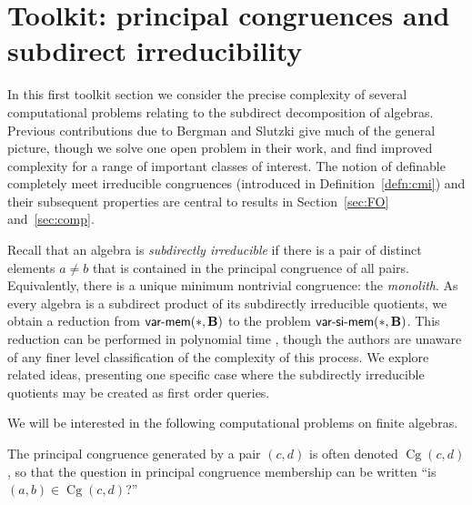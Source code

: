 \documentclass[10pt,a4paper]{amsart}
\theoremstyle{plain}
\theoremstyle{definition}
\newcommand{\varmem}{\textsf{var-mem}}
\newcommand{\varsimem}{\textsf{var-si-mem}}
\newcommand{\Cg}{\operatorname{Cg}}
\begin{document}
\section{Toolkit: principal congruences and subdirect irreducibility}\label{sec:si}
In this first toolkit section we consider the precise complexity of several computational problems relating to the subdirect decomposition of algebras.  Previous contributions due to Bergman and Slutzki \cite{berslu00,berslu00b,berslu02} give much of the general picture, though we solve one open problem in their work, and find improved complexity for a range of important classes of interest.
The notion of definable completely meet irreducible congruences (introduced in Definition~\ref{defn:cmi}) and their subsequent properties are central to results in Section~\ref{sec:FO} and~\ref{sec:comp}.

Recall that an algebra is \emph{subdirectly irreducible} if there is a pair of distinct elements $a\neq b$ that is contained in the principal congruence of all pairs.  Equivalently, there is a unique minimum nontrivial congruence: the \emph{monolith}.  As every algebra is a subdirect product of its subdirectly irreducible quotients,  we obtain a reduction from $\varmem(*,{\bf B})$ to the problem $\varsimem(*,{\bf B})$.  This reduction can be performed in polynomial time \cite{DDK}, though the authors are unaware of any finer level classification of the complexity of this process.  We explore related ideas, presenting one specific case where the subdirectly irreducible quotients may be created as first order queries.


We will be interested in the following computational problems on finite algebras.


\medskip

The principal congruence generated by a pair $(c,d)$ is often denoted $\Cg(c,d)$, so that the question in \textsf{principal congruence membership} can be written ``is $(a,b)\in \Cg(c,d)$?''
\end{document}
